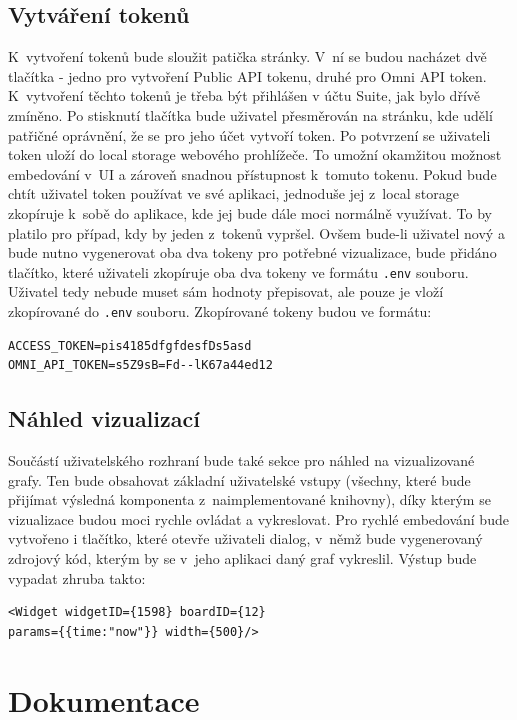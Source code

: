 \documentclass[czech, bc, kiv, he, iso690numb]{fasthesis}
\begin{document}
\subsection{Vytváření tokenů}

K~vytvoření tokenů bude sloužit patička stránky. V~ní se budou nacházet dvě tlačítka - jedno pro vytvoření Public API tokenu, druhé pro Omni API token. K~vytvoření těchto tokenů je třeba být přihlášen v
účtu Suite, jak bylo dřívě zmíněno. Po stisknutí tlačítka bude uživatel přesměrován na stránku, kde udělí patřičné oprávnění, že se pro jeho účet vytvoří token. Po potvrzení se uživateli token uloží
do local storage webového prohlížeče. To umožní okamžitou možnost embedování v~UI a zároveň snadnou přístupnost k~tomuto tokenu. Pokud bude chtít uživatel token používat ve své aplikaci, jednoduše jej z~local storage
zkopíruje k~sobě do aplikace, kde jej bude dále moci normálně využívat. To by platilo pro případ, kdy by jeden z~tokenů vypršel. Ovšem bude-li uživatel nový a bude nutno vygenerovat oba dva tokeny pro potřebné vizualizace,
bude přidáno tlačítko, které uživateli zkopíruje oba dva tokeny ve formátu \texttt{.env} souboru. Uživatel tedy nebude muset sám hodnoty přepisovat, ale pouze je vloží zkopírované do \texttt{.env} souboru. Zkopírované tokeny
budou ve formátu:
\lstset{style=plainsrc}
\begin{lstlisting}
ACCESS_TOKEN=pis4185dfgfdesfDs5asd
OMNI_API_TOKEN=s5Z9sB=Fd--lK67a44ed12
\end{lstlisting}

\subsection{Náhled vizualizací}
Součástí uživatelského rozhraní bude také sekce pro náhled na vizualizované grafy. Ten bude obsahovat základní uživatelské vstupy (všechny, které bude přijímat výsledná komponenta z~naimplementované knihovny), 
díky kterým se vizualizace budou moci rychle ovládat a vykreslovat. Pro rychlé embedování bude vytvořeno i tlačítko, které otevře uživateli dialog, v~němž bude vygenerovaný zdrojový kód, kterým by se
v~jeho aplikaci daný graf vykreslil. Výstup bude vypadat zhruba takto:

\lstset{style=plainsrc}
\begin{lstlisting}
<Widget widgetID={1598} boardID={12} 
params={{time:"now"}} width={500}/>
\end{lstlisting}


\section{Dokumentace}
\end{document}
